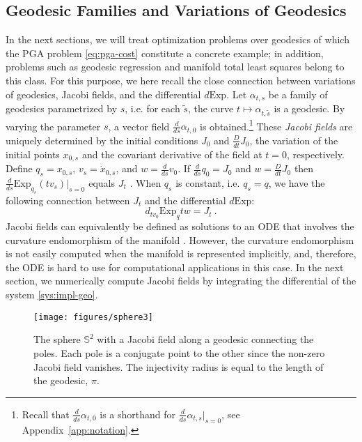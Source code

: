 \documentclass[final]{svjour3}
\newcommand{\SSS}{\mathbb{S}}
\newcommand{\df}[2]{\tfrac{d}{d#2} #1}
\newcommand{\Df}[2]{\tfrac{D}{d#2} #1}
\newcommand{\tm}{d}
\newcommand{\Exp}{\mathrm{Exp}}
\begin{document}
\subsection{Geodesic Families and Variations of Geodesics}
In the next sections, we will treat optimization problems over geodesics of which 
the PGA problem \eqref{eq:pga-cost} constitute a concrete example;
in addition, problems such as geodesic regression \cite{fletcher_geodesic_2011} and
manifold total least squares belong to this class.
For this purpose, we here recall the close connection between variations of geodesics,
Jacobi fields, and the differential $\tm\Exp$. 
Let $\alpha_{t,s}$ be a family of geodesics parametrized by $s$, i.e. for each
$\tilde{s}$, the curve $t\mapsto \alpha_{t,\tilde{s}}$ is a geodesic. 
By varying the parameter $s$, a vector field $\df{\alpha_{t,0}}{s}$ is obtained.\footnote{
Recall that $\df{\alpha_{t,0}}{s}$ is a shorthand for
$\df{\alpha_{t,s}}{s}|_{s=0}$, see Appendix~\ref{app:notation}.}
These \emph{Jacobi fields} are uniquely determined by 
the initial conditions $J_0$ and $\Df{J_0}{t}$, the variation of the initial
points $x_{0,s}$ and the covariant derivative of the field at $t=0$, respectively. Define 
$q_s=x_{0,s}$, $v_s=\dot{x}_{0,s}$, and
$w=\df{v_0}{s}$. If $\df{q_0}{s}=J_0$ and $w=\Df{J_0}{t}$ then 
$\df{\Exp_{q_s}(tv_s)}{s}|_{s=0}$ equals $J_t$ \cite[Chap.
5]{do_carmo_riemannian_1992}. When $q_s$
is constant, i.e. $q_s=q$, we have the following connection between $J_t$ and
the differential $\tm\Exp$:
\begin{equation}
    \tm_{tv_0}\Exp_{q}tw
    =
    J_t
    \ .
    \label{eq:jacobi-dexp}
\end{equation}
Jacobi fields can equivalently be defined as solutions to an ODE that involves
the curvature endomorphism of the manifold \cite[Chap.
5]{do_carmo_riemannian_1992}.  However, the curvature
endomorphism is not easily computed when the manifold is represented implicitly,
and, therefore, the ODE is hard to use for computational applications in this
case. In the next section, we
numerically compute Jacobi fields by integrating the
differential of the system \eqref{sys:impl-geo}.
\begin{figure}[h]
    \begin{center}
      \texttt{[image: figures/sphere3]}
    \end{center}
    \caption{The sphere $\SSS^2$ with a Jacobi field along a geodesic connecting
    the poles. Each pole is a conjugate point to the other since the non-zero Jacobi
    field vanishes. The injectivity radius is equal to the length of the
    geodesic, $\pi$.}
    \label{fig:sphere-jacobi}
\end{figure}
\end{document}
